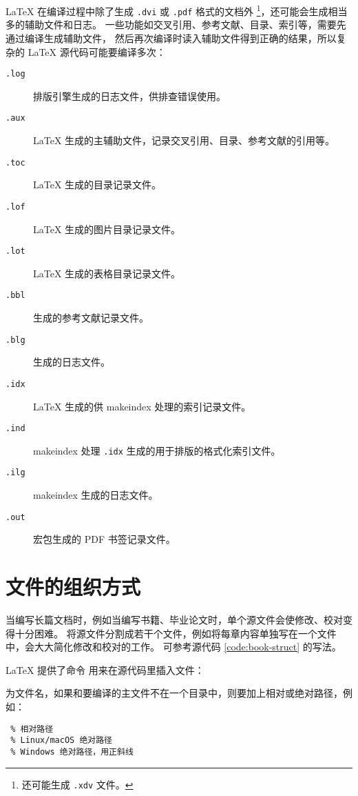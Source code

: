 \LaTeX{} 在编译过程中除了生成 \texttt{.dvi} 或 \texttt{.pdf} 格式的文档外%
\footnote{ 还可能生成 \texttt{.xdv} 文件。}，还可能会生成相当多的辅助文件和日志。
一些功能如交叉引用、参考文献、目录、索引等，需要先通过编译生成辅助文件，
然后再次编译时读入辅助文件得到正确的结果，所以复杂的 \LaTeX{} 源代码可能要编译多次：
\begin{description}
  \item[\texttt{.log}] 排版引擎生成的日志文件，供排查错误使用。
  \item[\texttt{.aux}] \LaTeX{} 生成的主辅助文件，记录交叉引用、目录、参考文献的引用等。
  \item[\texttt{.toc}] \LaTeX{} 生成的目录记录文件。
  \item[\texttt{.lof}] \LaTeX{} 生成的图片目录记录文件。
  \item[\texttt{.lot}] \LaTeX{} 生成的表格目录记录文件。
  \item[\texttt{.bbl}]  生成的参考文献记录文件。
  \item[\texttt{.blg}]  生成的日志文件。
  \item[\texttt{.idx}] \LaTeX{} 生成的供 makeindex 处理的索引记录文件。
  \item[\texttt{.ind}] makeindex 处理 \texttt{.idx} 生成的用于排版的格式化索引文件。
  \item[\texttt{.ilg}] makeindex 生成的日志文件。
  \item[\texttt{.out}]  宏包生成的 PDF 书签记录文件。
\end{description}

\section{文件的组织方式}\label{sec:latex-multi-files}

当编写长篇文档时，例如当编写书籍、毕业论文时，单个源文件会使修改、校对变得十分困难。
将源文件分割成若干个文件，例如将每章内容单独写在一个文件中，会大大简化修改和校对的工作。
可参考源代码 \ref{code:book-struct} 的写法。

\LaTeX{} 提供了命令  用来在源代码里插入文件：
\begin{command}
\end{command}
 为文件名，如果和要编译的主文件不在一个目录中，则要加上相对或绝对路径，例如：
\begin{verbatim}
 % 相对路径
 % Linux/macOS 绝对路径
 % Windows 绝对路径，用正斜线
\end{verbatim}

